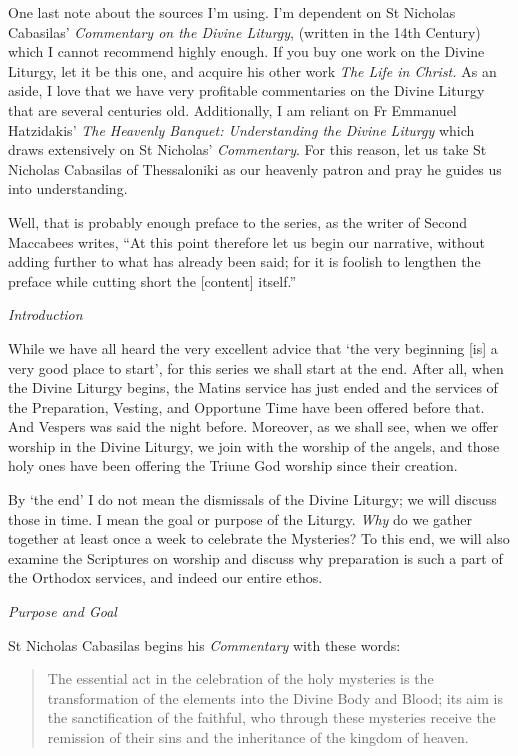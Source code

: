 \documentclass[
]{article}
\begin{document}
One last note about the sources I'm using. I'm dependent on St Nicholas
Cabasilas' \emph{Commentary on the Divine Liturgy}, (written in the 14th
Century) which I cannot recommend highly enough. If you buy one work on
the Divine Liturgy, let it be this one, and acquire his other work
\emph{The Life in Christ.} As an aside, I love that we have very
profitable commentaries on the Divine Liturgy that are several centuries
old. Additionally, I am reliant on Fr Emmanuel Hatzidakis' \emph{The
Heavenly Banquet: Understanding the Divine Liturgy} which draws
extensively on St Nicholas' \emph{Commentary}. For this reason, let us
take St Nicholas Cabasilas of Thessaloniki as our heavenly patron and
pray he guides us into understanding.

Well, that is probably enough preface to the series, as the writer of
Second Maccabees writes, ``At this point therefore let us begin our
narrative, without adding further to what has already been said; for it
is foolish to lengthen the preface while cutting short the {[}content{]}
itself.''

\emph{Introduction}

While we have all heard the very excellent advice that `the very
beginning {[}is{]} a very good place to start', for this series we shall
start at the end. After all, when the Divine Liturgy begins, the Matins
service has just ended and the services of the Preparation, Vesting, and
Opportune Time have been offered before that. And Vespers was said the
night before. Moreover, as we shall see, when we offer worship in the
Divine Liturgy, we join with the worship of the angels, and those holy
ones have been offering the Triune God worship since their creation.

By `the end' I do not mean the dismissals of the Divine Liturgy; we will
discuss those in time. I mean the goal or purpose of the Liturgy.
\emph{Why} do we gather together at least once a week to celebrate the
Mysteries? To this end, we will also examine the Scriptures on worship
and discuss why preparation is such a part of the Orthodox services, and
indeed our entire ethos.

\emph{Purpose and Goal}

St Nicholas Cabasilas begins his \emph{Commentary} with these words:

\begin{quote}
The essential act in the celebration of the holy mysteries is the
transformation of the elements into the Divine Body and Blood; its aim
is the sanctification of the faithful, who through these mysteries
receive the remission of their sins and the inheritance of the kingdom
of heaven.
\end{quote}
\end{document}
